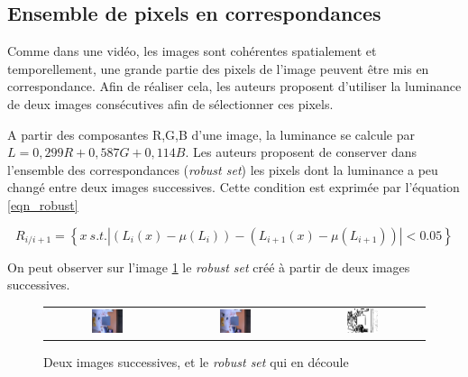 \subsection{Ensemble de pixels en correspondances}
Comme dans une vidéo, les images sont cohérentes spatialement et temporellement, une grande partie des pixels de l'image peuvent être mis en correspondance. Afin de réaliser cela, les auteurs proposent d'utiliser la luminance de deux images consécutives afin de sélectionner ces pixels.

A partir des composantes R,G,B d'une image, la luminance se calcule par $L = 0,299 R + 0,587 G + 0,114 B$. Les auteurs proposent de conserver dans l'ensemble des correspondances (\textit{robust set}) les pixels dont la luminance a peu changé entre deux images successives. Cette condition est exprimée par l'équation \ref{eqn_robust}

\begin{equation}
R_{i/i+1} = \left\{x \: s.t. |(L_{i}(x)-\mu(L_{i})) - (L_{i+1}(x)-\mu(L_{i+1}))| < 0.05 \right\}
\label{eqn_robust}
\end{equation}

On peut observer sur l'image \ref{fig_robust} le \textit{robust set} créé à partir de deux images successives.

\begin{figure}[H]
\centering
\begin{tabular}{ccc}
\includegraphics[width = 0.27\textwidth]{Chapters/Images/rs1}&
\includegraphics[width = 0.27\textwidth]{Chapters/Images/rs2}&
\includegraphics[width = 0.27\textwidth]{Chapters/Images/rs3}
\end{tabular}
\caption{Deux images successives, et le \textit{robust set} qui en découle}
\label{fig_robust}
\end{figure}

